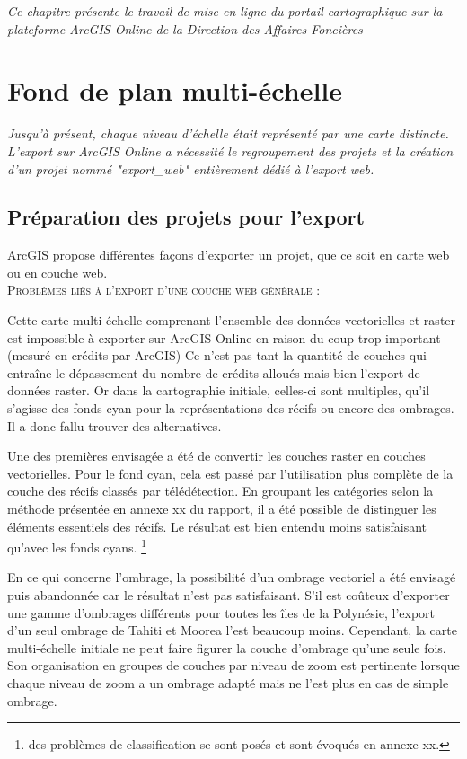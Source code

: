 
\textit{Ce chapitre présente le travail de mise en ligne du portail cartographique sur la plateforme ArcGIS Online de la Direction des Affaires Foncières}

\section{Fond de plan multi-échelle}

\textit{Jusqu'à présent, chaque niveau d'échelle était représenté par une carte distincte. L'export sur ArcGIS Online a nécessité le regroupement des projets et la création d'un projet nommé "export\_web" entièrement dédié à l'export web.}

\subsection{ Préparation des projets pour l'export}

ArcGIS propose différentes façons d'exporter un projet, que ce soit en carte web ou en couche web.  \\

\textsc{Problèmes liés à l'export d'une couche web générale :}

Cette carte multi-échelle comprenant l'ensemble des données vectorielles et raster est impossible à exporter sur ArcGIS Online en raison du coup trop important (mesuré en crédits par ArcGIS)
Ce n'est pas tant la quantité de couches qui entraîne le dépassement du nombre de crédits alloués mais bien l'export de données raster.
Or dans la cartographie initiale, celles-ci sont multiples, qu'il s'agisse des fonds cyan pour la représentations des récifs ou encore des ombrages. Il a donc fallu trouver des alternatives.

Une des premières envisagée a été de convertir les couches raster en couches vectorielles. Pour le fond cyan, cela est passé par l'utilisation plus complète de la couche des récifs classés par télédétection. En groupant les catégories selon la méthode présentée en annexe xx du rapport, il a été possible de distinguer les éléments essentiels des récifs. Le résultat est bien entendu moins satisfaisant qu'avec les fonds cyans. \footnote{des problèmes de classification se sont posés et sont évoqués en annexe xx.}

En ce qui concerne l'ombrage, la possibilité d'un ombrage vectoriel a été envisagé puis abandonnée car le résultat n'est pas satisfaisant. S'il est coûteux d'exporter une gamme d'ombrages différents pour toutes les îles de la Polynésie, l'export d'un seul ombrage de Tahiti et Moorea l'est beaucoup moins. Cependant, la carte multi-échelle initiale ne peut faire figurer la couche d'ombrage qu'une seule fois. Son organisation en groupes de couches par niveau de zoom est pertinente lorsque chaque niveau de zoom a un ombrage adapté mais ne l'est plus en cas de simple ombrage. 

